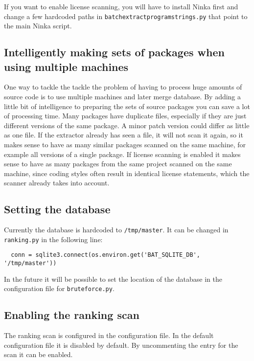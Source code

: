 \documentclass[10pt]{article}
\begin{document}
If you want to enable license scanning, you will have to install Ninka first
and change a few hardcoded paths in \texttt{batchextractprogramstrings.py} that
point to the main Ninka script.

\subsection{Intelligently making sets of packages when using multiple machines}

One way to tackle the tackle the problem of having to process huge amounts of
source code is to use multiple machines and later merge database. By adding a
little bit of intelligence to preparing the sets of source packages you can
save a lot of processing time. Many packages have duplicate files, especially
if they are just different versions of the same package. A minor patch version
could differ as little as one file. If the extractor already has seen a file, it
will not scan it again, so it makes sense to have as many similar packages
scanned on the same machine, for example all versions of a single package. If
license scanning is enabled it makes sense to have as many packages from the
same project scanned on the same machine, since coding styles often result in
identical license statements, which the scanner already takes into account.

\subsection{Setting the database}

Currently the database is hardcoded to \texttt{/tmp/master}. It can be changed
in \texttt{ranking.py} in the following line:

\begin{verbatim}
  conn = sqlite3.connect(os.environ.get('BAT_SQLITE_DB', '/tmp/master'))
\end{verbatim}

In the future it will be possible to set the location of the database in the
configuration file for \texttt{bruteforce.py}.

\subsection{Enabling the ranking scan}

The ranking scan is configured in the configuration file. In the default
configuration file it is disabled by default. By uncommenting the entry for the
scan it can be enabled.
\end{document}
